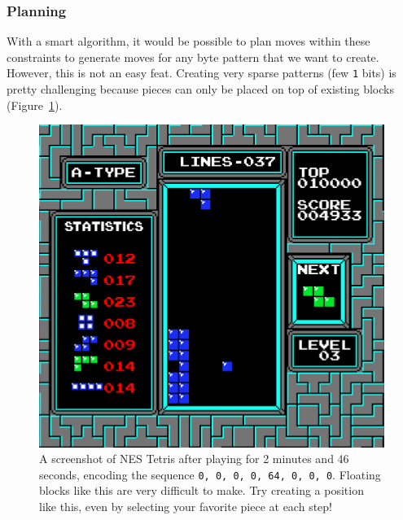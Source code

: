 \documentclass[twocolumn]{article}
\begin{document}
\subsubsection{Planning}

With a smart algorithm, it would be possible to plan moves within
these constraints to generate moves for any byte pattern that we want
to create. However, this is not an easy feat. Creating very sparse
patterns (few {\tt 1} bits) is pretty challenging because pieces can
only be placed on top of existing blocks (Figure~\ref{fig:tetrisdot}).

\begin{figure}
  \centering
  \includegraphics[width=\linewidth]{tetrisdot}
  \caption{
    A screenshot of NES Tetris after playing for 2 minutes and 46
    seconds, encoding the sequence {\tt 0, 0, 0, 0, 64, 0, 0, 0}.
    Floating blocks like this are very difficult to make. Try
    creating a position like this, even by selecting your favorite
    piece at each step!
  } \label{fig:tetrisdot}
\end{figure}
\end{document}

